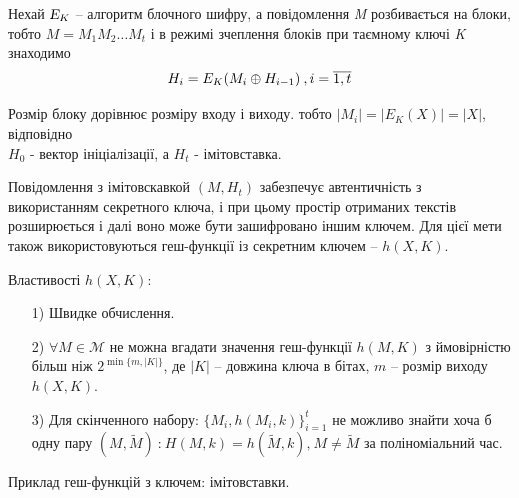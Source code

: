 Нехай $ \textsl{E}_K $ -- алгоритм блочного шифру, а повідомлення 
\textsl{M} розбивається на блоки, \\
тобто $ M = M_1 M_2 \dots M_t $ і в режимі зчеплення блоків при таємному ключі \textsl{K} знаходимо
\begin{equation}
H_i = E_K(M_i \oplus H_{i-1}) \:, i=\overline{1,t}
\end{equation}

Розмір блоку дорівнює розміру входу і виходу. тобто
$ |M_i | = |E_K(X)| = |X| $, відповідно \\
$ H_0 $ - вектор ініціалізації, а $ H_t $ - імітовставка. \par
Повідомлення з імітовскавкой $ (M, H_t) $ забезпечує автентичність з 
використанням секретного ключа, і при цьому простір отриманих текстів 
розширюється і далі воно може бути зашифровано іншим ключем. Для цієї мети 
також використовуються геш-функції із секретним ключем -- $h(X,K)$.  
\\ \par
Властивості $h(X,K)$:
\begin{enumerate}
\item[1)] Швидке обчислення.
\item[2)] $ \forall M \in \mathcal{M} $ не можна вгадати значення 
геш-функції $h(M,K)$ з ймовірністю більш ніж $ 2^{\min\{m,|K|\}} $, 
де $|K|$ -- довжина ключа в бітах, $m$ -- розмір виходу $h(X,K)$.
\item[3)] Для скінченного набору: $ \{M_i, h(M_i, k) \}_ {i = 1}^ t $ не можливо знайти хоча б одну пару
 $ (M, \widetilde{M}) \: \text {:} \: H(M, k) = h(\widetilde {M}, k) \text{,}\: M \neq \widetilde {M} $ за поліноміальний час.
 
\end{enumerate}
 
Приклад геш-функцій з ключем: імітовставки.

